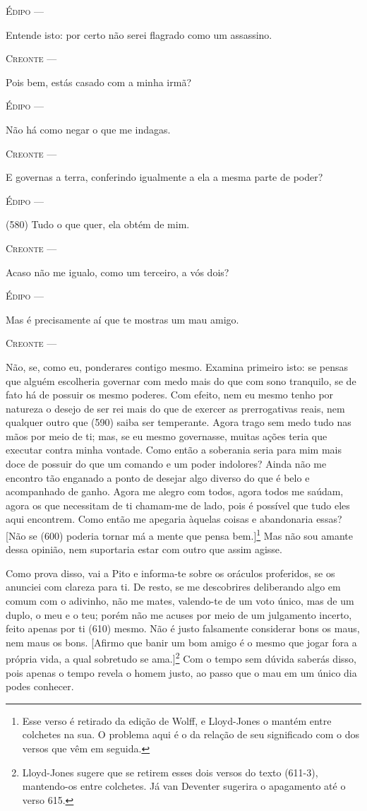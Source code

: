 \textsc{Édipo} ---

Entende isto: por certo não serei flagrado como um assassino.

\textsc{Creonte} ---

Pois bem, estás casado com a minha irmã?

\textsc{Édipo} ---

Não há como negar o que me indagas.

\textsc{Creonte} ---

E governas a terra, conferindo igualmente a ela a mesma parte de poder?

\textsc{Édipo} ---

(580) Tudo o que quer, ela obtém de mim.

\textsc{Creonte} ---

Acaso não me igualo, como um terceiro, a vós dois?

\textsc{Édipo} ---

Mas é precisamente aí que te mostras um mau amigo.

\textsc{Creonte} ---

Não, se, como eu, ponderares contigo mesmo. Examina primeiro isto: se
pensas que alguém escolheria governar com medo mais do que com sono
tranquilo, se de fato há de possuir os mesmo poderes. Com efeito, nem eu
mesmo tenho por natureza o desejo de ser rei mais do que de exercer as
prerrogativas reais, nem qualquer outro que (590) saiba ser temperante.
Agora trago sem medo tudo nas mãos por meio de ti; mas, se eu mesmo
governasse, muitas ações teria que executar contra minha vontade. Como
então a soberania seria para mim mais doce de possuir do que um comando
e um poder indolores? Ainda não me encontro tão enganado a ponto de
desejar algo diverso do que é belo e acompanhado de ganho. Agora me
alegro com todos, agora todos me saúdam, agora os que necessitam de ti
chamam-me de lado, pois é possível que tudo eles aqui encontrem. Como
então me apegaria àquelas coisas e abandonaria essas? {[}Não se (600)
poderia tornar má a mente que pensa bem.{]}\footnote{Esse verso é
  retirado da edição de Wolff, e Lloyd-Jones o mantém entre colchetes na
  sua. O problema aqui é o da relação de seu significado com o dos
  versos que vêm em seguida.} Mas não sou amante dessa opinião, nem
suportaria estar com outro que assim agisse.

Como prova disso, vai a Pito e informa-te sobre os oráculos proferidos,
se os anunciei com clareza para ti. De resto, se me descobrires
deliberando algo em comum com o adivinho, não me mates, valendo-te de um
voto único, mas de um duplo, o meu e o teu; porém não me acuses por meio
de um julgamento incerto, feito apenas por ti (610) mesmo. Não é justo
falsamente considerar bons os maus, nem maus os bons. {[}Afirmo que
banir um bom amigo é o mesmo que jogar fora a própria vida, a qual
sobretudo se ama.{]}\footnote{Lloyd-Jones sugere que se retirem esses
  dois versos do texto (611-3), mantendo-os entre colchetes. Já van
  Deventer sugerira o apagamento até o verso 615.} Com o tempo sem
dúvida saberás disso, pois apenas o tempo revela o homem justo, ao passo
que o mau em um único dia podes conhecer.

